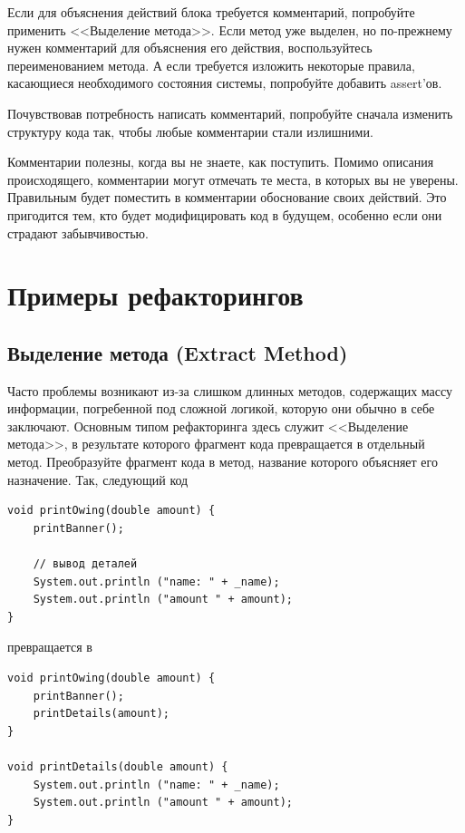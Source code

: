 \documentclass{../../text-style}
\begin{document}
Если для объяснения действий блока требуется комментарий, попробуйте применить <<Выделение метода>>. Если метод уже выделен, но по-прежнему нужен комментарий для объяснения его действия, воспользуйтесь переименованием метода. А если требуется изложить некоторые правила, касающиеся необходимого состояния системы, попробуйте добавить assert’ов.

Почувствовав потребность написать комментарий, попробуйте сначала изменить структуру кода так, чтобы любые комментарии стали излишними.

Комментарии полезны, когда вы не знаете, как поступить. Помимо описания происходящего, комментарии могут отмечать те места, в которых вы не уверены. Правильным будет поместить в комментарии обоснование своих действий. Это пригодится тем, кто будет модифицировать код в будущем, особенно если они страдают забывчивостью.

\section{Примеры рефакторингов}

\subsection{Выделение метода (Extract Method)}

Часто проблемы возникают из-за слишком длинных методов, содержащих массу информации, погребенной под сложной логикой, которую они обычно в себе заключают. Основным типом рефакторинга здесь служит <<Выделение метода>>, в результате которого фрагмент кода превращается в отдельный метод. Преобразуйте фрагмент кода в метод, название которого объясняет его назначение. Так, следующий код

\begin{verbatim}
void printOwing(double amount) {
    printBanner();

    // вывод деталей
    System.out.println ("name: " + _name);
    System.out.println ("amount " + amount);
}
\end{verbatim}

превращается в 

\begin{verbatim}
void printOwing(double amount) {
    printBanner();
    printDetails(amount);
}

void printDetails(double amount) {
    System.out.println ("name: " + _name);
    System.out.println ("amount " + amount);
}
\end{verbatim}
\end{document}
